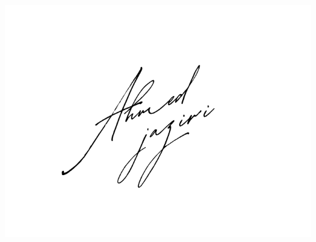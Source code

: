 \begin{flushright}
    \begin{minipage}{0.4\textwidth}
        \centering
        \includegraphics[width=1\textwidth]{images/Ahmed_jaziri_signature.png}\\
    \end{minipage}
\end{flushright}

\thispagestyle{empty} 